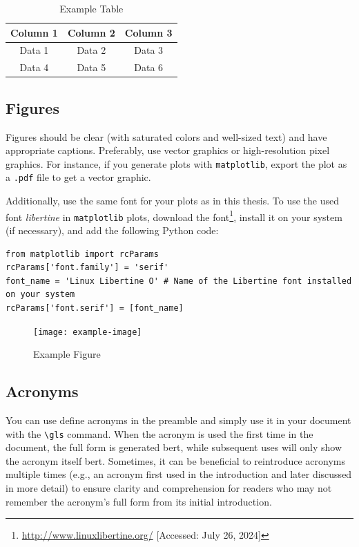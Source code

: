 \documentclass[a4paper,12pt,notitlepage,twoside,openright]{report}
\begin{document}
\begin{table}[h]
    \centering
    \begin{tabular}{ccc}
        \toprule
        Column 1 & Column 2 & Column 3 \\
        \midrule
        Data 1 & Data 2 & Data 3 \\
        Data 4 & Data 5 & Data 6 \\
        \bottomrule
    \end{tabular}
    \caption{Example Table}
    \label{tab:example}
\end{table}

\subsection{Figures}
Figures should be clear (with saturated colors and well-sized text) and have appropriate captions. Preferably, use vector graphics or high-resolution pixel graphics. For instance, if you generate plots with \texttt{matplotlib}, export the plot as a \texttt{.pdf} file to get a vector graphic.

Additionally, use the same font for your plots as in this thesis. To use the used font \emph{libertine} in \texttt{matplotlib} plots, download the font\footnote{\url{http://www.linuxlibertine.org/} [Accessed: July 26, 2024]}, install it on your system (if necessary), and add the following Python code:

\begin{verbatim}
from matplotlib import rcParams
rcParams['font.family'] = 'serif'
font_name = 'Linux Libertine O' # Name of the Libertine font installed on your system
rcParams['font.serif'] = [font_name]  
\end{verbatim}

\begin{figure}[t]
    \centering
    \texttt{[image: example-image]}
    \caption{Example Figure}
    \label{fig:example}
\end{figure}

\subsection{Acronyms}
You can use define acronyms in the preamble and simply use it in your document with the \texttt{\textbackslash gls} command. When the acronym is used the first time in the document, the full form is generated \gls{bert}, while subsequent uses will only show the acronym itself \gls{bert}. Sometimes, it can be beneficial to reintroduce acronyms multiple times (e.g., an acronym first used in the introduction and later discussed in more detail) to ensure clarity and comprehension for readers who may not remember the acronym's full form from its initial introduction.
\end{document}
